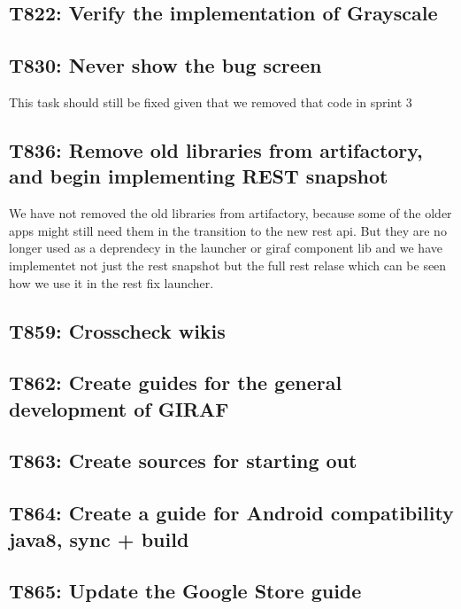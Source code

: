 \subsection{T822: Verify the implementation of Grayscale}

\subsection{T830: Never show the bug screen}
This task should still be fixed given that we removed that code in sprint 3

\subsection{T836: Remove old libraries from artifactory, and begin implementing REST
snapshot}
We have not removed the old libraries from artifactory, because some of the
older apps might still need them in the transition to the new rest api. But they
are no longer used as a deprendecy in the launcher or giraf component lib and we
have implementet not just the rest snapshot but the full rest relase which can
be seen how we use it in the rest fix launcher.

\subsection{T859: Crosscheck wikis}

\subsection{T862: Create guides for the general development of GIRAF}

\subsection{T863: Create sources for starting out}

\subsection{T864: Create a guide for Android compatibility java8, sync + build}

\subsection{T865: Update the Google Store guide}

